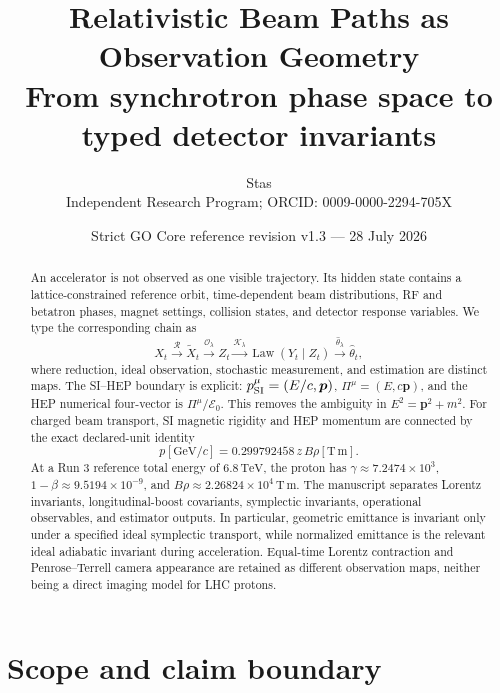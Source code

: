 \documentclass[11pt,a4paper]{article}
\title{\bfseries Relativistic Beam Paths as Observation Geometry\\
\large From synchrotron phase space to typed detector invariants}
\author{Stas\\
\small Independent Research Program; ORCID: 0009-0000-2294-705X}
\date{Strict GO Core reference revision v1.3 --- 28 July 2026}
\theoremstyle{definition}
\theoremstyle{plain}
\theoremstyle{remark}
\newcommand{\Law}{\operatorname{Law}}
\newcommand{\GeV}{\mathrm{GeV}}
\newcommand{\TeV}{\mathrm{TeV}}
\newcommand{\Ocal}{\mathcal O}
\newcommand{\Kcal}{\mathcal K}
\newcommand{\Rcal}{\mathcal R}
\newcommand{\Ecal}{\mathcal E}
\begin{document}
\maketitle

\begin{center}
\end{center}

\begin{abstract}
An accelerator is not observed as one visible trajectory. Its hidden
state contains a lattice-constrained reference orbit, time-dependent
beam distributions, RF and betatron phases, magnet settings, collision
states, and detector response variables. We type the corresponding
chain as
\[
X_t\xrightarrow{\Rcal}\widetilde X_t
\xrightarrow{\Ocal_\lambda}Z_t
\xrightarrow{\Kcal_\lambda}\Law(Y_t\mid Z_t)
\xrightarrow{\widehat\theta_\lambda}
\widehat\theta_t,
\]
where reduction, ideal observation, stochastic measurement, and
estimation are distinct maps. The SI--HEP boundary is explicit:
\(p^\mu_{\rm SI}=(E/c,\bm p)\),
\(\Pi^\mu=(E,c\bm p)\), and the HEP numerical four-vector is
\(\Pi^\mu/\Ecal_0\). This removes the ambiguity in
\(E^2=\bm p^2+m^2\). For charged beam transport, SI magnetic rigidity
and HEP momentum are connected by the exact declared-unit identity
\[
p[\GeV/c]=0.299792458\,z\,B\rho[\mathrm{T\,m}].
\]
At a Run 3 reference total energy of \(6.8\,\TeV\), the proton has
\(\gamma\approx7.2474\times10^3\),
\(1-\beta\approx9.5194\times10^{-9}\), and
\(B\rho\approx2.26824\times10^4\,\mathrm{T\,m}\). The manuscript
separates Lorentz invariants, longitudinal-boost covariants,
symplectic invariants, operational observables, and estimator outputs.
In particular, geometric emittance is invariant only under a specified
ideal symplectic transport, while normalized emittance is the relevant
ideal adiabatic invariant during acceleration. Equal-time Lorentz
contraction and Penrose--Terrell camera appearance are retained as
different observation maps, neither being a direct imaging model for
LHC protons.
\end{abstract}

\tableofcontents

\section{Scope and claim boundary}
\end{document}
